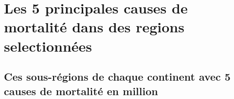 \documentclass[
]{article}
\newenvironment{Shaded}{\begin{snugshade}}{\end{snugshade}}
\newcommand{\AttributeTok}[1]{\textcolor[rgb]{0.13,0.29,0.53}{#1}}
\newcommand{\DecValTok}[1]{\textcolor[rgb]{0.00,0.00,0.81}{#1}}
\newcommand{\FloatTok}[1]{\textcolor[rgb]{0.00,0.00,0.81}{#1}}
\newcommand{\FunctionTok}[1]{\textcolor[rgb]{0.13,0.29,0.53}{\textbf{#1}}}
\newcommand{\NormalTok}[1]{#1}
\newcommand{\OtherTok}[1]{\textcolor[rgb]{0.56,0.35,0.01}{#1}}
\newcommand{\SpecialCharTok}[1]{\textcolor[rgb]{0.81,0.36,0.00}{\textbf{#1}}}
\newcommand{\StringTok}[1]{\textcolor[rgb]{0.31,0.60,0.02}{#1}}
\begin{document}
\begin{Shaded}
\end{Shaded}

\hypertarget{les-5-principales-causes-de-mortalituxe9-dans-des-regions-selectionnuxe9es}{%
\section{Les 5 principales causes de mortalité dans des regions
selectionnées}\label{les-5-principales-causes-de-mortalituxe9-dans-des-regions-selectionnuxe9es}}

\hypertarget{ces-sous-ruxe9gions-de-chaque-continent-avec-5-causes-de-mortalituxe9-en-million}{%
\subsection{Ces sous-régions de chaque continent avec 5 causes de
mortalité en
million}\label{ces-sous-ruxe9gions-de-chaque-continent-avec-5-causes-de-mortalituxe9-en-million}}
\end{document}
